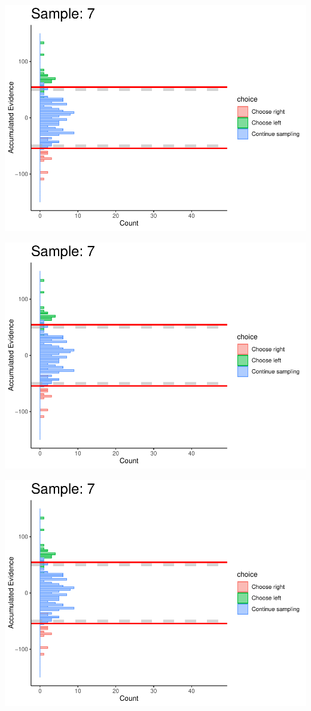 \documentclass[
]{book}
\begin{document}
\begin{center}\includegraphics[width=0.8\linewidth]{LateNightBayes_files/figure-latex/fixed_dcb-61} \end{center}

\begin{center}\includegraphics[width=0.8\linewidth]{LateNightBayes_files/figure-latex/fixed_dcb-62} \end{center}

\begin{center}\includegraphics[width=0.8\linewidth]{LateNightBayes_files/figure-latex/fixed_dcb-63} \end{center}
\end{document}

